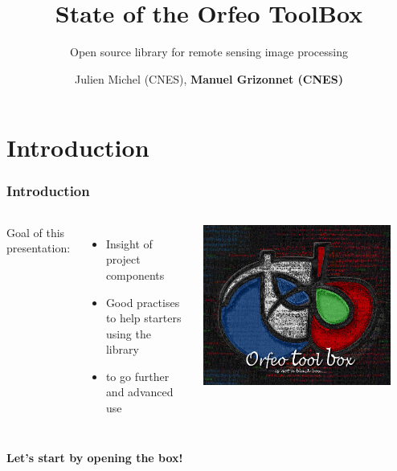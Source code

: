 \documentclass[8pt]{beamer}
\title{State of the Orfeo ToolBox}
\subtitle{Open source library for remote sensing image processing}
\author{Julien Michel (CNES), \textbf{Manuel Grizonnet (CNES)}}%
\date{}
\begin{document}
\begin{frame}
\titlepage
\end{frame}

\section{Introduction}

\begin{frame}
\frametitle{Introduction}
\begin{columns}
Goal of this presentation:
\begin{itemize}
\item Insight of project components 
\item Good practises to help starters using the library
\item to go further and advanced use
\end{itemize}
\includegraphics[width=0.9\textwidth]{images/LOGOTB_blackbox.png}
\end{columns}
\begin{center}
{\huge \color{red}{Orfeo ToolBox is not a black box\ldots}}

\textbf{Let's start by opening the box!}
\end{center}

\end{frame}
\end{document}
